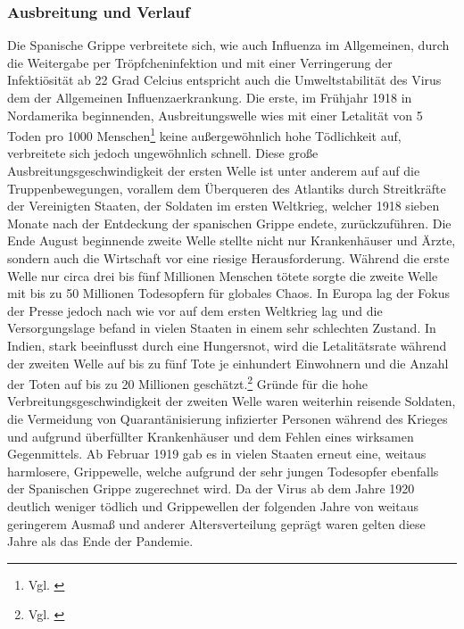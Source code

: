 \documentclass[12pt]{article}
\begin{document}
\subsubsection{Ausbreitung und Verlauf}
Die Spanische Grippe verbreitete sich, wie auch Influenza im Allgemeinen, durch die Weitergabe per Tröpfcheninfektion und mit einer Verringerung der Infektiösität ab 22 Grad Celcius entspricht auch die Umweltstabilität des Virus dem der Allgemeinen Influenzaerkrankung. Die erste, im Frühjahr 1918 in Nordamerika beginnenden, Ausbreitungswelle wies mit einer Letalität von 5 Toden pro 1000 Menschen\footnote{Vgl. \cite{Jeff06}} keine außergewöhnlich hohe Tödlichkeit auf, verbreitete sich jedoch ungewöhnlich schnell. Diese große Ausbreitungsgeschwindigkeit der ersten Welle ist unter anderem auf auf die Truppenbewegungen, vorallem dem Überqueren des Atlantiks durch Streitkräfte der Vereinigten Staaten, der Soldaten im ersten Weltkrieg, welcher 1918 sieben Monate nach der Entdeckung der spanischen Grippe endete, zurückzuführen. 
Die Ende August beginnende zweite Welle stellte nicht nur Krankenhäuser und Ärzte, sondern auch die Wirtschaft vor eine riesige Herausforderung. Während die erste Welle nur circa drei bis fünf Millionen Menschen tötete sorgte die zweite Welle mit bis zu 50 Millionen Todesopfern für globales Chaos. In Europa lag der Fokus der Presse jedoch nach wie vor auf dem ersten Weltkrieg lag und die Versorgungslage befand in vielen Staaten in einem sehr schlechten Zustand. In Indien, stark beeinflusst durch eine Hungersnot,  wird die Letalitätsrate während der zweiten Welle auf bis zu fünf Tote je einhundert Einwohnern und die Anzahl der Toten auf bis zu 20 Millionen geschätzt.\footnote{Vgl. \cite{Bax20}} Gründe für die hohe Verbreitungsgeschwindigkeit der zweiten Welle waren weiterhin reisende Soldaten, die Vermeidung von Quarantänisierung infizierter Personen während des Krieges und aufgrund überfüllter Krankenhäuser und dem Fehlen eines wirksamen Gegenmittels.
Ab Februar 1919 gab es in vielen Staaten erneut eine, weitaus harmlosere, Grippewelle, welche aufgrund der sehr jungen Todesopfer ebenfalls der Spanischen Grippe zugerechnet wird. Da der Virus ab dem Jahre 1920 deutlich weniger tödlich und Grippewellen der folgenden Jahre von weitaus geringerem Ausmaß und anderer Altersverteilung geprägt waren gelten diese Jahre als das Ende der Pandemie.
\end{document}
